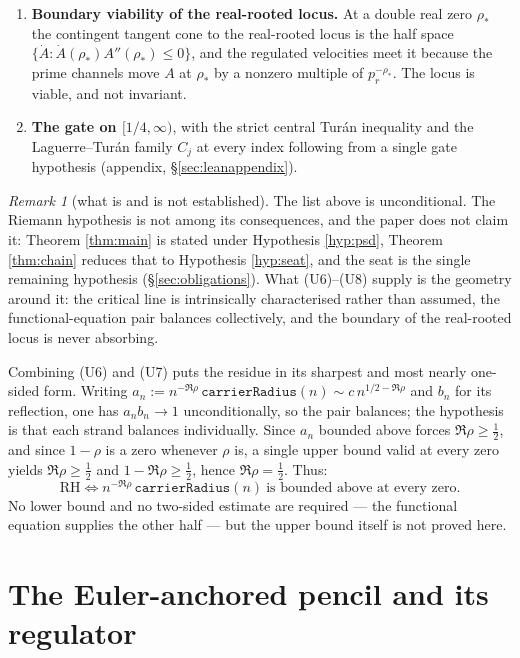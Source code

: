 \documentclass[11pt]{article}
\theoremstyle{plain}
\theoremstyle{definition}
\theoremstyle{remark}
\newtheorem{remark}[theorem]{Remark}
\begin{document}
\begin{enumerate}
used. Equality of the two magnitudes holds if and only if \(\Re\rho=\tfrac12\).
\item[(U8)] \textbf{Boundary viability of the real-rooted locus.} At a double real
zero \(\rho_*\) the contingent tangent cone to the real-rooted locus is the half
space \(\{\dot A:\dot A(\rho_*)A''(\rho_*)\le0\}\), and the regulated velocities meet
it because the prime channels move \(A\) at \(\rho_*\) by a nonzero multiple of
\(p_r^{-\rho_*}\). The locus is viable, and not invariant.
\item[(U9)] \textbf{The gate on \([1/4,\infty)\)}, with the strict central Tur\'an
inequality and the Laguerre--Tur\'an family \(C_j\) at every index following from a
single gate hypothesis (appendix, \S\ref{sec:leanappendix}).
\end{enumerate}

\begin{remark}[what is and is not established]\label{rem:status}
The list above is unconditional. The Riemann hypothesis is not among its
consequences, and the paper does not claim it: Theorem \ref{thm:main} is stated under
Hypothesis \ref{hyp:psd}, Theorem \ref{thm:chain} reduces that to Hypothesis
\ref{hyp:seat}, and the seat is the single remaining hypothesis
(\S\ref{sec:obligations}). What (U6)--(U8) supply is the geometry around it: the
critical line is intrinsically characterised rather than assumed, the
functional-equation pair balances collectively, and the boundary of the real-rooted
locus is never absorbing.

Combining (U6) and (U7) puts the residue in its sharpest and most nearly one-sided
form. Writing \(a_n:=n^{-\Re\rho}\,\texttt{carrierRadius}(n)\sim c\,n^{1/2-\Re\rho}\)
and \(b_n\) for its reflection, one has \(a_nb_n\to1\) unconditionally, so the pair
balances; the hypothesis is that each strand balances individually. Since \(a_n\)
bounded above forces \(\Re\rho\ge\tfrac12\), and since \(1-\rho\) is a zero whenever
\(\rho\) is, a single upper bound valid at every zero yields
\(\Re\rho\ge\tfrac12\) and \(1-\Re\rho\ge\tfrac12\), hence \(\Re\rho=\tfrac12\).
Thus:
\[
  \text{RH}\iff
  n^{-\Re\rho}\,\texttt{carrierRadius}(n)\ \text{is bounded above at every zero.}
\]
No lower bound and no two-sided estimate are required --- the functional equation
supplies the other half --- but the upper bound itself is not proved here.
\end{remark}

\section{The Euler-anchored pencil and its regulator}
\end{document}
